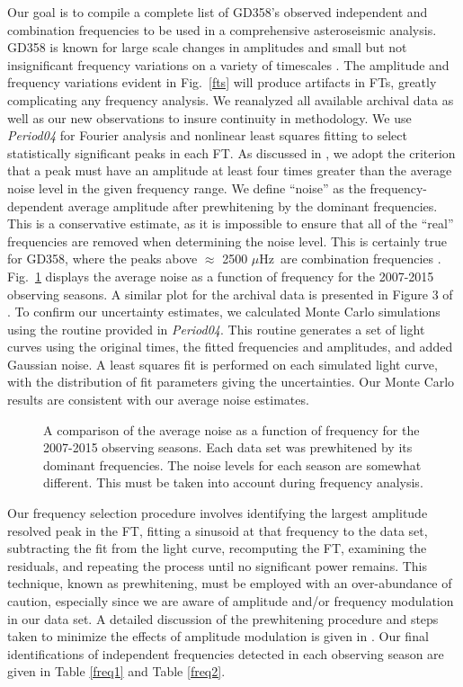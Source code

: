 \documentclass[12pt,preprint]{aastex}
\begin{document}
Our goal is to compile a complete list of GD358's observed independent and combination frequencies 
to be used in a comprehensive asteroseismic analysis. GD358 is known for large scale changes in 
amplitudes and small but not insignificant frequency variations on a variety of timescales 
\citep{Provencal09}.  The amplitude and frequency variations evident in Fig.~\ref{fts} will 
produce artifacts in FTs, greatly complicating any frequency analysis.  
We reanalyzed all available archival data \citep{Provencal09, Kepler03, Winget94, Winget82} 
as well as our new observations to insure continuity in methodology.  We use 
{\sl Period04} \citep{Lenz05} for Fourier analysis and nonlinear least squares fitting to 
select statistically significant peaks in each FT.  As discussed in \citet{Provencal12}, 
we adopt the criterion that a peak must have an amplitude at least four times greater than the 
average noise level in the given frequency range. We define ``noise'' as the frequency-dependent 
average amplitude after prewhitening by the dominant frequencies. This is a conservative estimate, 
as it is impossible to ensure that all of the ``real'' frequencies are removed when determining
the noise level. This is certainly true for GD358, where the peaks above $\approx$ 2500 $\mu$Hz\ 
are combination frequencies \citep{Provencal09}.  Fig.~\ref{noise} displays the average noise 
as a function of frequency for the 2007-2015 observing seasons. A similar plot for the 
archival data is presented in Figure 3 of \citet{Provencal09}. To confirm our uncertainty 
estimates, we calculated Monte Carlo simulations using the routine provided in {\sl Period04}.  
This routine generates a set of light curves using the original times, the fitted frequencies and 
amplitudes, and added Gaussian noise. A least squares fit is performed on each simulated light 
curve, with the distribution of fit parameters giving the uncertainties. Our Monte Carlo results 
are consistent with our average noise estimates.

\begin{figure}
\caption{A comparison of the average noise as a function of frequency for the 2007-2015 observing 
seasons.  Each data set was prewhitened by its dominant frequencies.  The noise levels for each 
season are somewhat different.  This must be taken into account during frequency analysis.  
\label{noise}
}
\end{figure}

Our frequency selection procedure involves identifying the largest amplitude resolved peak in the FT,
fitting a sinusoid at that frequency to the data set, subtracting the fit from the light curve, 
recomputing the FT, examining the residuals, and repeating the process until no significant power 
remains. This technique, known as prewhitening, must be employed with an over-abundance of caution, 
especially since we are aware of amplitude and/or frequency modulation in our data set. A detailed
discussion of the prewhitening procedure and steps taken to minimize the effects of amplitude 
modulation is given in \citep{Provencal09}. Our final identifications of independent frequencies
detected in each observing season are given in Table \ref{freq1} and Table \ref{freq2}.
\end{document}
